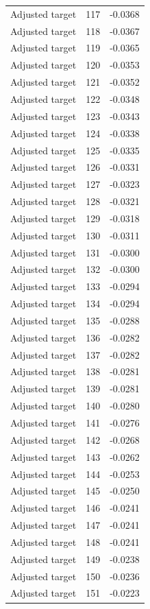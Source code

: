 \begin{table}[htbp]
\begin{tabular}{lll}
Adjusted target & 117 & -0.0368 \\
Adjusted target & 118 & -0.0367 \\
Adjusted target & 119 & -0.0365 \\
Adjusted target & 120 & -0.0353 \\
Adjusted target & 121 & -0.0352 \\
Adjusted target & 122 & -0.0348 \\
Adjusted target & 123 & -0.0343 \\
Adjusted target & 124 & -0.0338 \\
Adjusted target & 125 & -0.0335 \\
Adjusted target & 126 & -0.0331 \\
Adjusted target & 127 & -0.0323 \\
Adjusted target & 128 & -0.0321 \\
Adjusted target & 129 & -0.0318 \\
Adjusted target & 130 & -0.0311 \\
Adjusted target & 131 & -0.0300 \\
Adjusted target & 132 & -0.0300 \\
Adjusted target & 133 & -0.0294 \\
Adjusted target & 134 & -0.0294 \\
Adjusted target & 135 & -0.0288 \\
Adjusted target & 136 & -0.0282 \\
Adjusted target & 137 & -0.0282 \\
Adjusted target & 138 & -0.0281 \\
Adjusted target & 139 & -0.0281 \\
Adjusted target & 140 & -0.0280 \\
Adjusted target & 141 & -0.0276 \\
Adjusted target & 142 & -0.0268 \\
Adjusted target & 143 & -0.0262 \\
Adjusted target & 144 & -0.0253 \\
Adjusted target & 145 & -0.0250 \\
Adjusted target & 146 & -0.0241 \\
Adjusted target & 147 & -0.0241 \\
Adjusted target & 148 & -0.0241 \\
Adjusted target & 149 & -0.0238 \\
Adjusted target & 150 & -0.0236 \\
Adjusted target & 151 & -0.0223 \\

\end{tabular}
\end{table}
